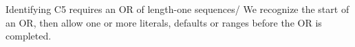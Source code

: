 Identifying C5 requires an OR of length-one sequences/
We recognize the start of an OR, then allow one or more literals, defaults or ranges before the OR is completed.




